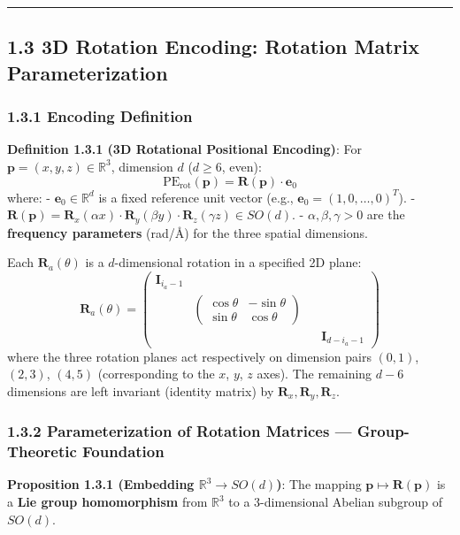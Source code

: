 \documentclass[
  12pt,
]{article}
\begin{document}
\begin{center}\rule{0.5\linewidth}{0.5pt}\end{center}

\subsection{1.3 3D Rotation Encoding: Rotation Matrix Parameterization}\label{3d-rotation-encoding}

\subsubsection{1.3.1 Encoding Definition}\label{rotation-encoding-definition}

\textbf{Definition 1.3.1 (3D Rotational Positional Encoding)}: For $\mathbf{p} = (x, y, z) \in \mathbb{R}^3$, dimension $d$ ($d \geq 6$, even):
\[\boxed{\text{PE}_{\text{rot}}(\mathbf{p}) = \mathbf{R}(\mathbf{p}) \cdot \mathbf{e}_0}\]
where:
- $\mathbf{e}_0 \in \mathbb{R}^d$ is a fixed reference unit vector (e.g., $\mathbf{e}_0 = (1, 0, \ldots, 0)^T$).
- $\mathbf{R}(\mathbf{p}) = \mathbf{R}_x(\alpha x) \cdot \mathbf{R}_y(\beta y) \cdot \mathbf{R}_z(\gamma z) \in SO(d)$.
- $\alpha, \beta, \gamma > 0$ are the \textbf{frequency parameters} (rad/\AA) for the three spatial dimensions.

Each $\mathbf{R}_a(\theta)$ is a $d$-dimensional rotation in a specified 2D plane:
\[\mathbf{R}_a(\theta) = \begin{pmatrix} \mathbf{I}_{i_a-1} & & & \\ & \begin{pmatrix} \cos\theta & -\sin\theta \\ \sin\theta & \cos\theta \end{pmatrix} & & \\ & & & \mathbf{I}_{d-i_a-1} \end{pmatrix}\]
where the three rotation planes act respectively on dimension pairs $(0,1)$, $(2,3)$, $(4,5)$ (corresponding to the $x$, $y$, $z$ axes). The remaining $d-6$ dimensions are left invariant (identity matrix) by $\mathbf{R}_x, \mathbf{R}_y, \mathbf{R}_z$.

\subsubsection{1.3.2 Parameterization of Rotation Matrices --- Group-Theoretic Foundation}\label{rotation-parameterization-group-theory}

\textbf{Proposition 1.3.1 (Embedding $\mathbb{R}^3 \to SO(d)$)}: The mapping $\mathbf{p} \mapsto \mathbf{R}(\mathbf{p})$ is a \textbf{Lie group homomorphism} from $\mathbb{R}^3$ to a 3-dimensional Abelian subgroup of $SO(d)$.
\end{document}
